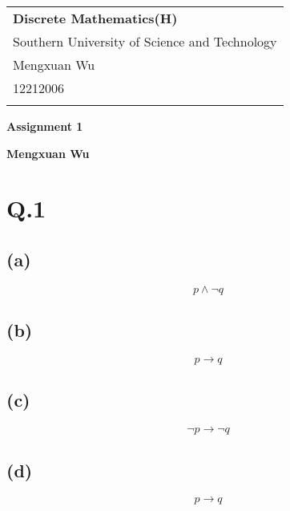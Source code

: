 \documentclass[a4paper,12pt]{article}
\begin{document}
\thispagestyle{empty} %

\begin{tabular}{p{15.5cm}}
{\large \bf Discrete Mathematics(H)} \\
Southern University of Science and Technology \\ Mengxuan Wu \\ 12212006 \\
\hline
\\
\end{tabular}

\vspace*{0.3cm} %

\begin{center}
	{\Large \bf Assignment 1}
	\vspace{2mm}

	{\bf Mengxuan Wu}
		
\end{center}  

\vspace{0.4cm}

\section*{Q.1}

\subsection*{(a)}
\begin{equation*}
	p \wedge \neg q 
\end{equation*}

\subsection*{(b)}
\begin{equation*}
	p \to q
\end{equation*}

\subsection*{(c)}
\begin{equation*}
	\neg p \to \neg q
\end{equation*}

\subsection*{(d)}
\begin{equation*}
	p \to q
\end{equation*}
\end{document}
